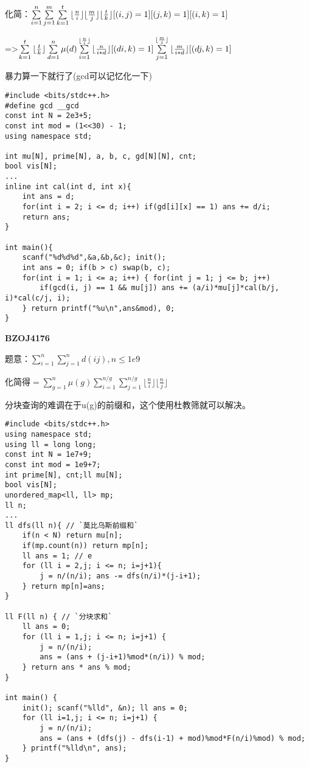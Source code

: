 化简：$\sum\limits_{i=1}^n\sum\limits_{j=1}^m\sum\limits_{k=1}^t {\lfloor {n\over i}\rfloor}{\lfloor {m\over j}\rfloor}{\lfloor {t\over k}\rfloor}  [(i,j)=1][(j,k)=1][(i,k)=1]$

=>$\sum\limits_{k=1}^t {\lfloor {t\over k}\rfloor} \sum\limits_{d=1}^n \mu(d) \sum\limits_{i=1}^ {\lfloor {n\over i}\rfloor}  {\lfloor {n\over i*d}\rfloor}[(di,k)=1] \sum\limits_{j=1}^ {\lfloor {m\over j}\rfloor} {\lfloor {m\over i*d}\rfloor} [(dj,k)=1]$

暴力算一下就行了(gcd可以记忆化一下)


\begin{lstlisting}
#include <bits/stdc++.h>
#define gcd __gcd
const int N = 2e3+5;
const int mod = (1<<30) - 1;
using namespace std;

int mu[N], prime[N], a, b, c, gd[N][N], cnt;
bool vis[N];
...
inline int cal(int d, int x){
    int ans = d;
    for(int i = 2; i <= d; i++) if(gd[i][x] == 1) ans += d/i;
    return ans;
}

int main(){
    scanf("%d%d%d",&a,&b,&c); init();
    int ans = 0; if(b > c) swap(b, c);
    for(int i = 1; i <= a; i++) { for(int j = 1; j <= b; j++)
        if(gcd(i, j) == 1 && mu[j]) ans += (a/i)*mu[j]*cal(b/j, i)*cal(c/j, i);
    } return printf("%u\n",ans&mod), 0;
}
\end{lstlisting}

{\bfseries BZOJ4176}

题意：$\sum_{i=1}^n \sum_{j=1}^nd(ij), n \le 1e9$

化简得$= \sum_{g=1}^{n} \mu(g) \sum_{i=1}^{n/g} \sum_{j=1}^{n/g}\lfloor \frac{n}{i} \rfloor \lfloor \frac{n}{j} \rfloor$

分块查询的难调在于u(g)的前缀和，这个使用杜教筛就可以解决。


\begin{lstlisting}
#include <bits/stdc++.h>
using namespace std;
using ll = long long;
const int N = 1e7+9;
const int mod = 1e9+7;
int prime[N], cnt;ll mu[N];
bool vis[N];
unordered_map<ll, ll> mp;
ll n;
...
ll dfs(ll n){ // `莫比乌斯前缀和`
    if(n < N) return mu[n];
    if(mp.count(n)) return mp[n];
    ll ans = 1; // e
    for (ll i = 2,j; i <= n; i=j+1){
        j = n/(n/i); ans -= dfs(n/i)*(j-i+1);
    } return mp[n]=ans;
}

ll F(ll n) { // `分块求和`
    ll ans = 0;
    for (ll i = 1,j; i <= n; i=j+1) {
        j = n/(n/i);
        ans = (ans + (j-i+1)%mod*(n/i)) % mod;
    } return ans * ans % mod;
}

int main() {
    init(); scanf("%lld", &n); ll ans = 0;
    for (ll i=1,j; i <= n; i=j+1) {
        j = n/(n/i);
        ans = (ans + (dfs(j) - dfs(i-1) + mod)%mod*F(n/i)%mod) % mod;
    } printf("%lld\n", ans);
}
\end{lstlisting}

